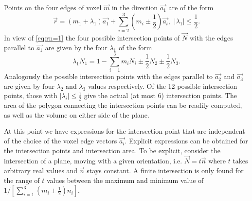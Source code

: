 Points on the four edges of voxel $\vec{m}$ in the direction $\vec{a_1}$ are of the form
\begin{equation}
\vec{r}=(m_1 + \lambda_1)  \vec{a_1}+\sum_{i=2}^{3}(m_i\pm\frac{1}{2}) \vec{a_i}, \hspace{5pt}  |\lambda_1 | \le \frac {1}{2}.
\end{equation}
In view of \ref{eq:rn=1} the four possible 
intersection points of $\vec{N}$ with the edges parallel to $\vec{a_1}$ are given by the four $\lambda_1$ of the form
\begin{equation}
\lambda_1 N_1 = 1 -\sum_{i=1}^{3}m_i N_i \pm\frac{1}{2} N_2 \pm\frac{1}{2} N_3.
\end{equation}
Analogously the possible intersection points with the edges parallel to $\vec{a_2}$ and $\vec{a_3}$ are given by four $\lambda_2$ and $\lambda_3$ values respectively. Of the 12 possible intersection points, those with $|\lambda_i | \le \frac {1}{2}$ give the actual (at most 6) intersection points. The area of the polygon connecting the intersection points can be readily computed, as well as the volume on either side of the plane. 

At this point we have expressions for the intersection point that are independent of the choice of the voxel edge vectors $\vec{a_i}$. Explicit expressions can be obtained for the intersection points and intersection area. To be explicit, consider the intersection of a plane, moving with a given orientation, i.e. $\vec{N} = t \vec{n}$ where $t$ takes arbitrary real values and $\vec{n}$ stays constant. A finite intersection is only found for the range of $t$ values between the maximum and
minimum value of $1/[\sum_{i=1}^{3} (m_i \pm\frac{1}{2}) n_i]$.
